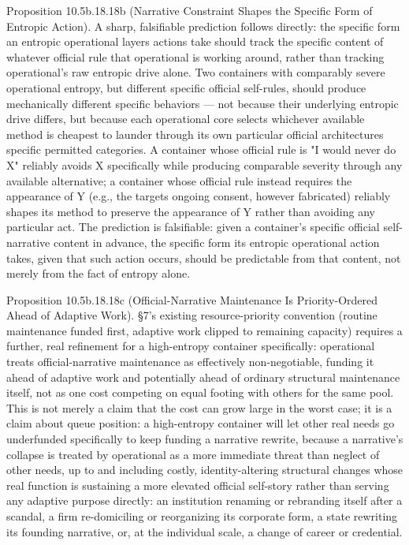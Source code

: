 \documentclass[
]{article}
\begin{document}
Proposition 10.5b.18.18b (Narrative Constraint Shapes the Specific Form
of Entropic Action). A sharp, falsifiable prediction follows directly:
the specific form an entropic operational layers actions take should
track the specific content of whatever official rule that operational is
working around, rather than tracking operational's raw entropic drive
alone. Two containers with comparably severe operational entropy, but
different specific official self-rules, should produce mechanically
different specific behaviors --- not because their underlying entropic
drive differs, but because each operational core selects whichever
available method is cheapest to launder through its own particular
official architectures specific permitted categories. A container whose
official rule is "I would never do X" reliably avoids X specifically
while producing comparable severity through any available alternative; a
container whose official rule instead requires the appearance of Y
(e.g., the targets ongoing consent, however fabricated) reliably shapes
its method to preserve the appearance of Y rather than avoiding any
particular act. The prediction is falsifiable: given a container's
specific official self-narrative content in advance, the specific form
its entropic operational action takes, given that such action occurs,
should be predictable from that content, not merely from the fact of
entropy alone.

Proposition 10.5b.18.18c (Official-Narrative Maintenance Is
Priority-Ordered Ahead of Adaptive Work). §7's existing
resource-priority convention (routine maintenance funded first, adaptive
work clipped to remaining capacity) requires a further, real refinement
for a high-entropy container specifically: operational treats
official-narrative maintenance as effectively non-negotiable, funding it
ahead of adaptive work and potentially ahead of ordinary structural
maintenance itself, not as one cost competing on equal footing with
others for the same pool. This is not merely a claim that the cost can
grow large in the worst case; it is a claim about queue position: a
high-entropy container will let other real needs go underfunded
specifically to keep funding a narrative rewrite, because a narrative's
collapse is treated by operational as a more immediate threat than
neglect of other needs, up to and including costly, identity-altering
structural changes whose real function is sustaining a more elevated
official self-story rather than serving any adaptive purpose directly:
an institution renaming or rebranding itself after a scandal, a firm
re-domiciling or reorganizing its corporate form, a state rewriting its
founding narrative, or, at the individual scale, a change of career or
credential.
\end{document}
